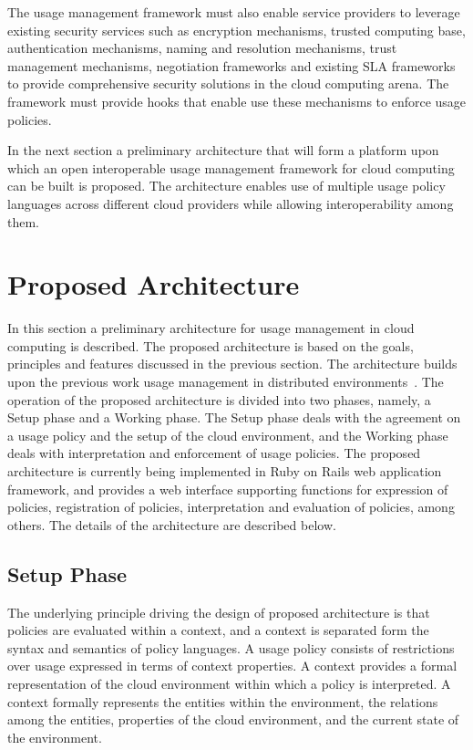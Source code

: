 \documentclass[10pt,letterpaper]{book}
\begin{document}
The usage management framework must also enable service providers to leverage existing security services such as encryption mechanisms, trusted computing base, authentication mechanisms, naming and resolution mechanisms, trust management mechanisms, negotiation frameworks and existing SLA frameworks to provide comprehensive security solutions in the cloud computing arena. The framework must provide hooks that enable use these mechanisms to enforce usage policies. 

In the next section a preliminary architecture that will form a platform upon which an open interoperable usage management framework for cloud computing can be built is proposed. The architecture enables use of multiple usage policy languages across different cloud providers while allowing interoperability among them. 

\section{Proposed Architecture}\label{sec:architecture}
In this section a preliminary architecture for usage management in cloud computing is described. The proposed architecture is based on the goals, principles and features discussed in the previous section. The architecture builds upon the previous work usage management in distributed environments~\cite{JaHeLa:10}.  The operation of the proposed architecture is divided into two phases, namely, a Setup phase and a Working phase. The Setup phase deals with the agreement on a usage policy and the setup of the cloud environment, and the Working phase deals with interpretation and enforcement of usage policies. The proposed architecture is currently being implemented in Ruby on Rails web application framework, and provides a web interface supporting functions for expression of policies, registration of policies, interpretation and evaluation of policies, among others. The details of the architecture are described below.

\subsection{Setup Phase}
The underlying principle driving the design of proposed architecture is that policies are evaluated within a context, and a context is separated form the syntax and semantics of policy languages. A usage policy consists of restrictions over usage expressed in terms of  context properties.  A context provides a formal representation of the cloud environment within which a policy is interpreted. A context formally represents the entities within the environment, the relations among the entities, properties of the cloud environment, and the current state of the environment. 
\end{document}
